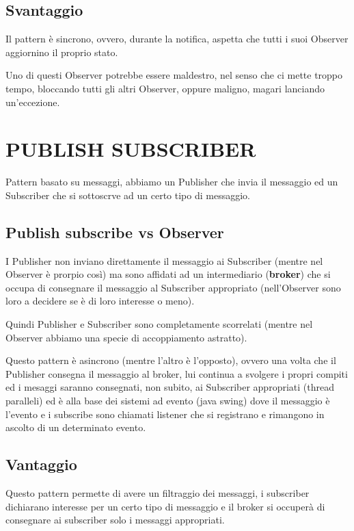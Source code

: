 \section{Svantaggio}

Il pattern è sincrono, ovvero, durante la notifica, aspetta che tutti i suoi Observer aggiornino il proprio stato.

Uno di questi Observer potrebbe essere maldestro, nel senso che ci mette troppo tempo, bloccando tutti gli altri Observer, oppure maligno, magari lanciando un'eccezione.

\chapter{PUBLISH SUBSCRIBER}

Pattern basato su messaggi, abbiamo un Publisher che invia il messaggio ed un Subscriber che si sottoscrve ad un certo tipo di messaggio.

\section{Publish subscribe vs Observer}

I Publisher non inviano direttamente il messaggio ai Subscriber (mentre nel Observer è prorpio così) ma sono affidati ad un intermediario (\textbf{broker}) che si 
occupa di consegnare il messaggio al Subscriber appropriato (nell'Observer sono loro a decidere se è di loro interesse o meno).

Quindi Publisher e Subscriber sono completamente scorrelati (mentre nel Observer abbiamo una specie di accoppiamento astratto).

Questo pattern è asincrono (mentre l'altro è l'opposto), ovvero una volta che il Publisher consegna il messaggio al broker, lui continua a svolgere i propri compiti 
ed i mesaggi saranno consegnati, non subito, ai Subscriber appropriati (thread paralleli) ed è alla base dei sistemi ad evento (java swing) dove il messaggio è l'evento 
e i subscribe sono chiamati listener che si registrano e rimangono in ascolto di un determinato evento.

\section{Vantaggio}

Questo pattern permette di avere un filtraggio dei messaggi, i subscriber dichiarano interesse per un certo tipo di messaggio e il broker si occuperà di consegnare ai 
subscriber solo i messaggi appropriati.